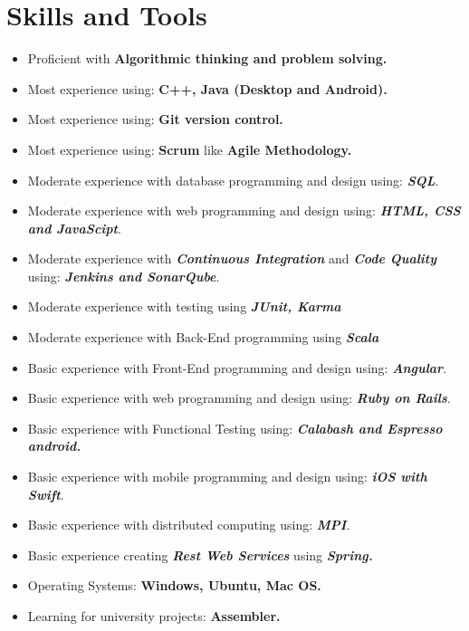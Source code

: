 \documentclass[a4paper,10pt]{article} %
\begin{document}

\section{Skills and Tools}
\begin{itemize}
 \item Proficient with \textbf{Algorithmic thinking and problem solving.}
 \item Most experience using: \textbf{C++, Java (Desktop and Android).}
 \item Most experience using: \textbf{Git version control.}
 \item Most experience using: \textbf{Scrum} like \textbf{Agile Methodology.}
 \item Moderate experience with database programming and design using: {\sl \textbf{SQL}}.
 \item Moderate experience with web programming and design using: {\sl \textbf{HTML, CSS and JavaScipt}}.
 \item Moderate experience with {\sl \textbf{Continuous Integration}} and {\sl \textbf{Code Quality}} using: {\sl \textbf{Jenkins and SonarQube}}.
 \item Moderate experience with testing using {\sl \textbf{JUnit, Karma}}
 \item Moderate experience with Back-End programming using {\sl \textbf{Scala}}
 \item Basic experience with Front-End programming and design using: {\sl \textbf{Angular}}.
 \item Basic experience with web programming and design using: {\sl \textbf{Ruby on Rails}}.
 \item Basic experience with Functional Testing using: {\sl \textbf{Calabash and Espresso android.}}
 \item Basic experience with mobile programming and design using: {\sl \textbf{iOS with Swift}}.
 \item Basic experience with distributed computing using: {\sl \textbf{MPI}}.
 \item Basic experience creating {\sl \textbf{Rest Web Services}} using {\sl \textbf{Spring.}}
 \item Operating Systems: \textbf{Windows, Ubuntu, Mac OS.}
 \item Learning for university projects: \textbf{Assembler.}
\end{itemize}
\end{document}
